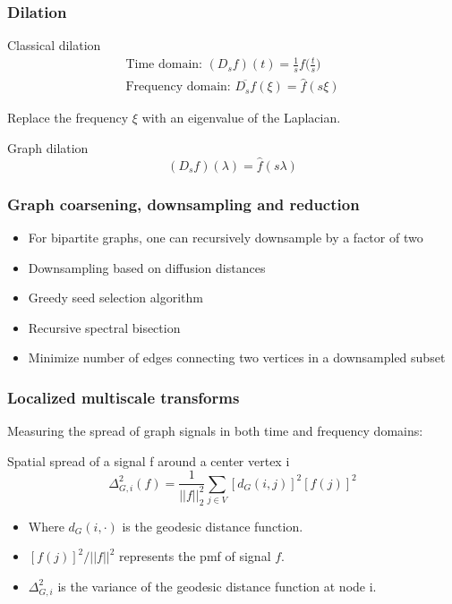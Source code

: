 \documentclass{beamer}
\begin{document}
\begin{frame}
  \frametitle{Dilation}

  \begin{block}{Classical dilation}
    \begin{equation}
      \begin{split}
        \text{Time domain: } (D_s f)(t) = \frac{1}{s} f \bigg( \frac{t}{s} \bigg) \\
        \text{Frequency domain: } \overline{D_s f}(\xi) = \hat{f}(s \xi)
      \end{split}
    \end{equation}
  \end{block}  

  Replace the frequency $\xi$ with an eigenvalue of the Laplacian.
  
  \begin{block}{Graph dilation}
    \begin{equation}
      (D_sf)(\lambda) = \hat{f} (s \lambda)
    \end{equation}
  \end{block}  
\end{frame}

\begin{frame}
  \frametitle{Graph coarsening, downsampling and reduction}

  \begin{itemize}
  \item For bipartite graphs, one can recursively downsample by a factor of two
  \item Downsampling based on diffusion distances
  \item Greedy seed selection algorithm
  \item Recursive spectral bisection
  \item Minimize number of edges connecting two vertices in a downsampled subset
  \end{itemize}
\end{frame}

\begin{frame}
  \frametitle{Localized multiscale transforms}

  Measuring the spread of graph signals in both time and frequency domains:

  \begin{block}{Spatial spread of a signal f around a center vertex i}
    \begin{equation}
      \Delta_{G,i}^2(f) = \frac{1}{|| f ||_2^2} \sum_{j \in V} [d_G(i, j)]^2 [f(j)]^2
    \end{equation}
  \end{block}  

  \begin{itemize}
  \item Where $d_G(i, \cdot)$ is the geodesic distance function.
  \item $[f(j)]^2 / || f ||^2$ represents the pmf of signal $f$.
  \item $\Delta_{G, i}^2$ is the variance of the geodesic distance function at
    node i.
  \end{itemize}
\end{frame}
\end{document}
